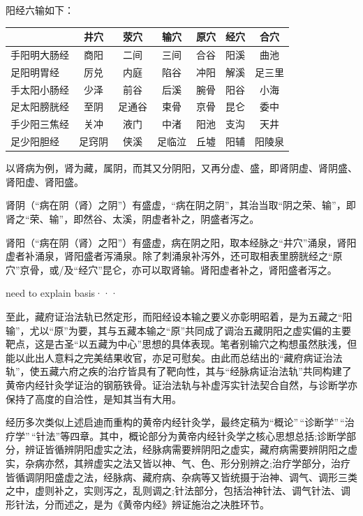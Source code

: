 \documentclass[
]{book}
\newcounter{none} %
\begin{document}
阳经六输如下：

{\def\LTcaptype{none} %
\begin{longtable}[]{@{}lcccccc@{}}
\toprule\noalign{}
& 井穴 & 荥穴 & 输穴 & 原穴 & 经穴 & 合穴 \\
\midrule\noalign{}
\endhead
\bottomrule\noalign{}
\endlastfoot
手阳明大肠经 & 商阳 & 二间 & 三间 & 合谷 & 阳溪 & 曲池 \\
足阳明胃经 & 厉兑 & 内庭 & 陷谷 & 冲阳 & 解溪 & 足三里 \\
手太阳小肠经 & 少泽 & 前谷 & 后溪 & 腕骨 & 阳谷 & 小海 \\
足太阳膀胱经 & 至阴 & 足通谷 & 束骨 & 京骨 & 昆仑 & 委中 \\
手少阳三焦经 & 关冲 & 液门 & 中渚 & 阳池 & 支沟 & 天井 \\
足少阳胆经 & 足窍阴 & 侠溪 & 足临泣 & 丘墟 & 阳辅 & 阳陵泉 \\
\end{longtable}
}

以肾病为例，肾为藏，属阴，而其又分阴阳，又再分虚、盛，即肾阴虚、肾阴盛、肾阳虚、肾阳盛。

肾阴（``病在阴（肾）之阴''）有盛虚，``病在阴之阴''，其治当取``阴之荣、输''，即肾之``荣、输''，即然谷、太溪，阴虚者补之，阴盛者泻之。

肾阳（``病在阴（肾）之阳''）有盛虚，病在阴之阳，取本经脉之``井穴''涌泉，肾阳虚者补涌泉，肾阳盛者泻涌泉。除了刺涌泉补泻外，还可取相表里膀胱经之``原穴''京骨，或/及``经穴''昆仑，亦可以取肾输。肾阳虚者补之，肾阳盛者泻之。

need to explain basis···

至此，藏府证治法轨已然定形，而阳经设本输之要义亦彰明昭着，是为五藏之``阳输''，尤以``原''为要，其与五藏本输之``原''共同成了调治五藏阴阳之虚实偏的主要靶点，这是古圣``以五藏为中心''思想的具体表现。笔者别输穴之构想虽然肤浅，但能以此出人意料之完美结果收官，亦足可慰矣。由此而总结出的``藏府病证治法轨''，使五藏六府之疾的治疗皆具有了靶向性，其与``经脉病证治法轨''共同构建了黄帝内经针灸学证治的钢筋铁骨。证治法轨与补虚泻实针法契合自然，与诊断学亦保持了高度的自洽性，是知其当有大用。

经历多次类似上述启迪而重构的黄帝内经针灸学，最终定稿为``概论''\,``诊断学''\,``治疗学''\,``针法''等四章。其中，概论部分为黄帝内经针灸学之核心思想总括;诊断学部分，辨证皆循辨阴阳虚实之法，经脉病需要辨阴阳之虚实，藏府病需要辨阴阳之虚实，杂病亦然，其辨虚实之法又皆以神、气、色、形分别辨之;治疗学部分，治疗皆循调阴阳盛虚之法，经脉病、藏府病、杂病等又皆统摄于治神、调气、调形三类之中，虚则补之，实则泻之，乱则调之;针法部分，包括治神针法、调气针法、调形针法，分而述之，是为《黄帝内经》辨证施治之决胜环节。
\end{document}
